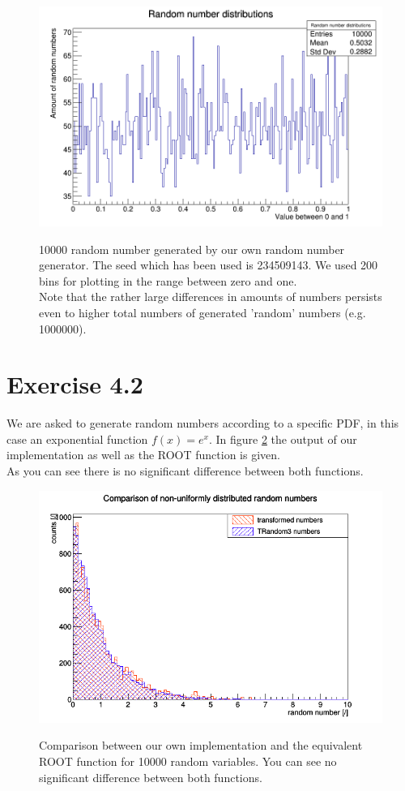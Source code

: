 \documentclass[10pt]{article}
\newenvironment{myfont}{\fontfamily{put}\selectfont}{\par}
\begin{document}
\begin{myfont}
\begin{figure}[H]
  \centering
  \caption{\num{10000} random number generated by our own random number generator.
  The seed which has been used is \num{234509143}.
  We used \num{200} bins for plotting in the range between zero and one. \\
  Note that the rather large differences in amounts of numbers persists even to higher total numbers of generated 'random' numbers (e.g. \num{1000000}).}
  \includegraphics[width = \textwidth]{./canvas.png}
  \label{fig:ex_1_results}
\end{figure}


\section*{Exercise 4.2}

We are asked to generate random numbers according to a specific PDF, in this case an exponential function $f(x) = e^{x}$.
In figure \ref{fig:exponential} the output of our implementation as well as the ROOT function is given. \\
As you can see there is no significant difference between both functions.

\begin{figure}[H]
  \centering
  \caption{Comparison between our own implementation and the equivalent ROOT function for \num{10000} random variables.
  You can see no significant difference between both functions.}
  \includegraphics[width = \textwidth]{./exercise4_2.png}
  \label{fig:exponential}
\end{figure}



\end{myfont}
\end{document}

